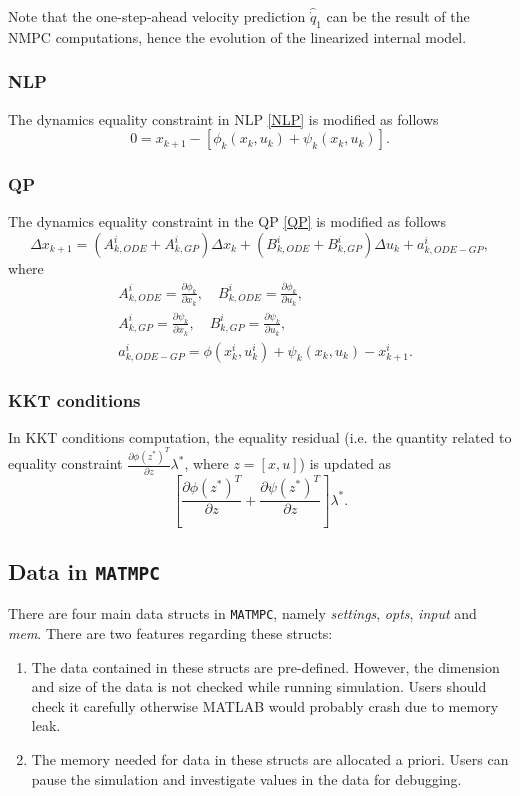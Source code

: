 \documentclass{article}
\newcommand{\software}[1]{{\tt#1}}
\newcommand{\alert}[1]{{\textit{#1}}}
\begin{document}
Note that the one-step-ahead velocity prediction $\hat{\dot{q}}_1$ can be the result of the NMPC computations, hence the evolution of the linearized internal model.

\subsubsection{NLP}
The dynamics equality constraint in NLP \eqref{NLP} is modified as follows
\begin{equation}
    0 = x_{k+1} - \left[\phi_k(x_k,u_k) + \psi_k(x_k,u_k)\right].
\end{equation}

\subsubsection{QP}
The dynamics equality constraint in the QP \eqref{QP} is modified as follows
\begin{equation}
    \Delta x_{k+1}= (A_{k,ODE}^i+A_{k,GP}^i) \Delta x_{k}+ (B_{k,ODE}^i+B_{k,GP}^i) \Delta u_{k} +a_{k,ODE-GP}^i,
\end{equation}
where
\begin{equation}
\begin{aligned}
&A_{k,ODE}^i=\frac{\partial \phi_k}{\partial x_k}, \quad B_{k,ODE}^i=\frac{\partial \phi_k}{\partial u_k},\\
&A_{k,GP}^i=\frac{\partial \psi_k}{\partial x_k}, \quad B_{k,GP}^i=\frac{\partial \psi_k}{\partial u_k},\\
&a_{k,ODE-GP}^i = \phi(x_k^i,u_k^i) + \psi_k(x_k,u_k) -x_{k+1}^i.
\end{aligned}
\end{equation}

\subsubsection{KKT conditions}
In KKT conditions computation, the equality residual (i.e. the quantity related to equality constraint $\frac{\partial \phi(z^*)^T}{\partial z} \lambda^*$, where $z = [x,u]$) is updated as
\begin{equation}
    \left[\frac{\partial \phi(z^*)^T}{\partial z} + \frac{\partial \psi(z^*)^T}{\partial z} \right] \lambda^*.
\end{equation}

\subsection{Data in \software{MATMPC}}
There are four main data structs in \software{MATMPC}, namely \alert{settings}, \alert{opts}, \alert{input} and \alert{mem}. There are two features regarding these structs:
\begin{enumerate}
	\item The data contained in these structs are pre-defined. However, the dimension and size of the data is not checked while running simulation. Users should check it carefully otherwise MATLAB would probably crash due to memory leak.
	\item The memory needed for data in these structs are allocated a priori. Users can pause the simulation and investigate values in the data for debugging.
\end{enumerate}
\end{document}

